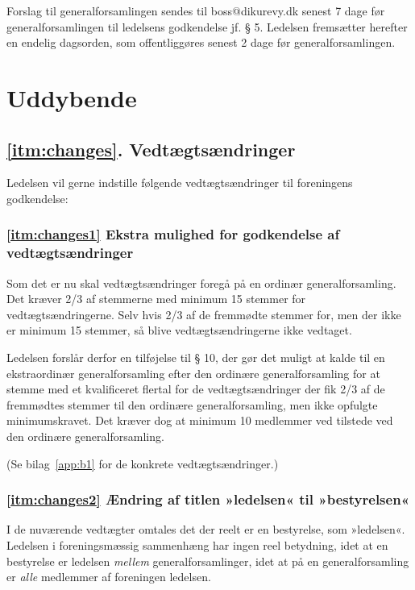 \documentclass[a4paper,11pt]{report}
\begin{document}
Forslag til generalforsamlingen sendes til boss@dikurevy.dk senest 7
dage før generalforsamlingen til ledelsens godkendelse jf. § 5.
Ledelsen fremsætter herefter en endelig dagsorden, som
offentliggøres senest 2 dage før generalforsamlingen.

\newpage

\section*{Uddybende}

\subsection*{\ref{itm:changes}. Vedtægtsændringer}

Ledelsen vil gerne indstille følgende vedtægtsændringer til foreningens
godkendelse:

\subsubsection*{\ref{itm:changes1} Ekstra mulighed for godkendelse af vedtægtsændringer}

Som det er nu skal vedtægtsændringer foregå på en ordinær
generalforsamling. Det kræver 2/3 af stemmerne med minimum 15 stemmer
for vedtægtsændringerne. Selv hvis 2/3 af de fremmødte stemmer for, 
men der ikke er minimum 15 stemmer, så blive vedtægtsændringerne
ikke vedtaget.

Ledelsen forslår derfor en tilføjelse til § 10, der gør det muligt at
kalde til en ekstraordinær generalforsamling efter den ordinære
generalforsamling for at stemme med et kvalificeret flertal for de
vedtægtsændringer der fik 2/3 af de fremmødtes stemmer til den ordinære
generalforsamling, men ikke opfulgte minimumskravet.  Det kræver dog at
minimum 10 medlemmer ved tilstede ved den ordinære generalforsamling.

(Se bilag~\ref{app:b1} for de konkrete vedtægtsændringer.)

\subsubsection*{\ref{itm:changes2} Ændring af titlen »ledelsen« til »bestyrelsen«}

I de nuværende vedtægter omtales det der reelt er en bestyrelse, som
»ledelsen«.  Ledelsen i foreningsmæssig sammenhæng har ingen reel
betydning, idet at en bestyrelse er ledelsen \emph{mellem}
generalforsamlinger, idet at på en generalforsamling er \emph{alle}
medlemmer af foreningen ledelsen.
\end{document}
